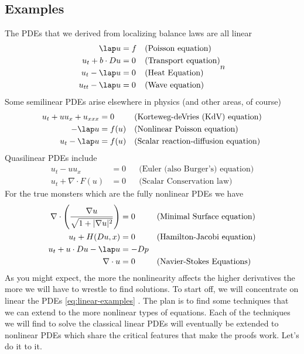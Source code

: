 \documentclass{bkcnotes}
\begin{document}
\subsection{Examples}
The PDEs that we derived from localizing balance laws are all linear
\begin{equation}
  \label{eq:linear-examples}
  \begin{aligned}
    \lap u &= f && \text{(Poisson equation)} \\
    u_t + b \cdot Du &= 0 && \text{(Transport equation)} \\
    u_t - \lap u &= 0 && \text{(Heat Equation)} \\
    u_{tt} - \lap u &= 0 && \text{(Wave equation)}
  \end{aligned}n
\end{equation}
Some semilinear PDEs arise elsewhere in physics (and other areas, of
course)
\begin{equation}
  \label{eq:semilinear-examples}
  \begin{aligned}
    u_t + uu_x + u_{xxx} &= 0 && \text{(Korteweg-deVries (KdV) equation)} \\
    -\lap u &= f(u) && \text{(Nonlinear Poisson equation)} \\
    u_t - \lap u &= f(u) && \text{(Scalar reaction-diffusion equation)}
  \end{aligned}
\end{equation}
Quasilinear PDEs include
\begin{equation}
  \label{eq:quasilinear-examples}
  \begin{aligned}
    u_t - uu_x &= 0 && \text{(Euler (also Burger's) equation)} \\
    u_t + \nabla \cdot F(u) &= 0 && \text{(Scalar Conservation law)}
  \end{aligned}
\end{equation}
For the true monsters which are the fully nonlinear PDEs we have
\begin{equation}
  \label{eq:nonlinear-examples}
  \begin{aligned}
    \nabla \cdot \left(\frac{\nabla u}{\sqrt{1 + |\nabla u|^2}}\right) &= 0
    && \text{(Minimal Surface equation)} \\
    u_t + H(Du,x) &= 0 && \text{(Hamilton-Jacobi equation)} \\
    u_t + u \cdot Du - \lap u &= -Dp \\
    \nabla \cdot u &= 0 && \text{(Navier-Stokes Equations)}
  \end{aligned}
\end{equation}
As you might expect, the more the nonlinearity affects the higher
derivatives the more we will have to wrestle to find solutions. To
start off, we will concentrate on linear the PDEs
\eqref{eq:linear-examples} . The plan is to find some techniques that
we can extend to the more nonlinear types of equations. Each of the
techniques we will find to solve the classical linear PDEs will
eventually be extended to nonlinear PDEs which share the critical
features that make the proofs work. Let's do it to it.
\end{document}
